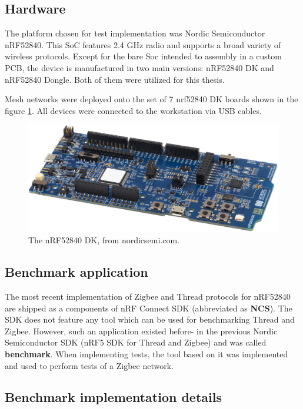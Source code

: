 \medskip


\subsection{Hardware}
 The platform chosen for test implementation was Nordic Semiconductor nRF52840. This SoC features 2.4 GHz 
 radio and supports a broad variety of wireless protocols. Except for the bare Soc intended to assembly in a 
 custom PCB, the device is manufactured in two main versions: nRF52840 DK and nRF52840 Dongle. Both of them were 
 utilized for this thesis.
 
 Mesh networks were deployed onto the set of 7 nrf52840 DK boards shown in the figure \ref{fig:test_boards}. All devices were connected to the
 workstation via USB cables.

\begin{figure}[H]
    \centering
    \includegraphics[scale=0.3]{images/test_boards.png}
    \caption{The nRF52840 DK, from nordicsemi.com.}
    \label{fig:test_boards}
\end{figure}

\subsection{Benchmark application}
\label{sec:benchmark}

The most recent implementation of Zigbee and Thread protocols for nRF52840 are shipped as a components of nRF
Connect  SDK (abbreviated as \textbf{NCS}). The SDK does not feature any tool which can be used for 
benchmarking Thread and Zigbee. However, such an application existed before- in the previous Nordic Semiconductor SDK (nRF5 SDK for Thread and Zigbee) and was called \textbf{benchmark}. When implementing tests, the tool based on 
it was implemented and used to perform tests of a Zigbee network.

\subsection*{Benchmark implementation details}


